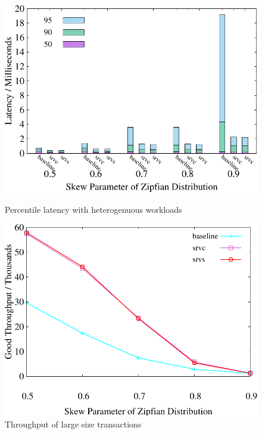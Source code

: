\begin{figure}[t]
{\begin{minipage}[b]{0.32\linewidth}
        \label{fig:weighted:abort}
    \end{minipage}
}
    \begin{minipage}[b]{0.32\linewidth}
            \centering
            \includegraphics[width=\textwidth]{./exp_fig/weighted_size/percent95_latency}
            \vspace{-2em}
            \caption{Percentile latency with heterogenuous workloads}
            \label{fig:weighted:p95}
        \end{minipage}
        \begin{minipage}[b]{0.32\linewidth}
        \centering
        \includegraphics[width=\textwidth]{./exp_fig/weighted_size/tps_1}
        \vspace{-2em}
        \caption{Throughput of large size transactions}
        \label{fig:weighted:tps1}
    \end{minipage}
    \vspace{-1em}
\end{figure}
